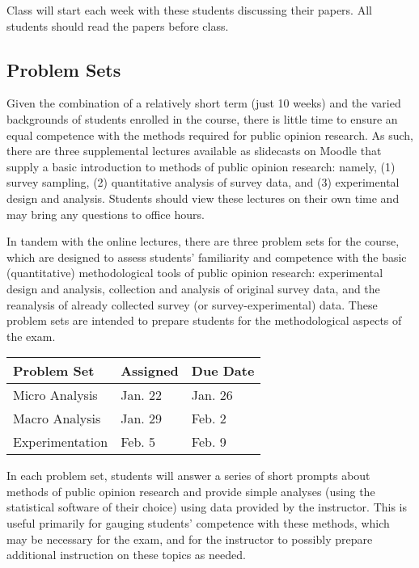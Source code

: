 \documentclass[12pt,a4paper]{article}
\begin{document}
Class will start each week with these students discussing their papers. All students should read the papers before class.

\subsection{Problem Sets}

Given the combination of a relatively short term (just 10 weeks) and the varied backgrounds of students enrolled in the course, there is little time to ensure an equal competence with the methods required for public opinion research. As such, there are three supplemental lectures available as slidecasts on Moodle that supply a basic introduction to methods of public opinion research: namely, (1) survey sampling, (2) quantitative analysis of survey data, and (3) experimental design and analysis. Students should view these lectures on their own time and may bring any questions to office hours.

In tandem with the online lectures, there are three problem sets for the course, which are designed to assess students' familiarity and competence with the basic (quantitative) methodological tools of public opinion research: experimental design and analysis, collection and analysis of original survey data, and the reanalysis of already collected survey (or survey-experimental) data. These problem sets are intended to prepare students for the methodological aspects of the exam.

\begin{center}
\begin{tabular}{lll} \hline
\textbf{Problem Set} & \textbf{Assigned} & \textbf{Due Date} \\ \hline
Micro Analysis & Jan. 22 & Jan. 26 \\
Macro Analysis & Jan. 29 & Feb. 2 \\
Experimentation & Feb. 5 & Feb. 9 \\ \hline
\end{tabular}
\end{center}

In each problem set, students will answer a series of short prompts about methods of public opinion research and provide simple analyses (using the statistical software of their choice) using data provided by the instructor. This is useful primarily for gauging students' competence with these methods, which may be necessary for the exam, and for the instructor to possibly prepare additional instruction on these topics as needed.
\end{document}
